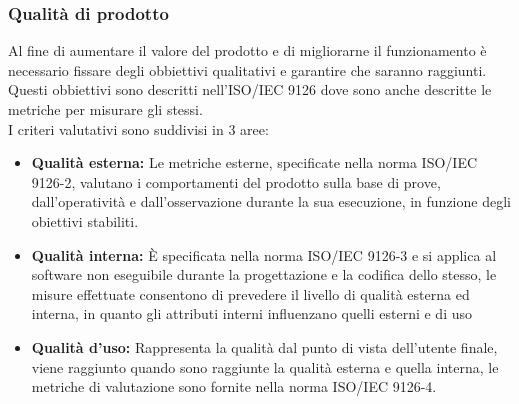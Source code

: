 \documentclass[a4paper]{article}
\begin{document}
			\subsubsection{Qualità di prodotto}
				Al fine di aumentare il valore del prodotto e di migliorarne il funzionamento è necessario fissare degli obbiettivi
				qualitativi e garantire che saranno raggiunti.\\
				Questi obbiettivi sono descritti nell'ISO/IEC 9126 dove sono anche descritte le metriche per misurare gli stessi.\\
				I criteri valutativi sono suddivisi in 3 aree:
				\begin{itemize}
					\item \textbf{Qualità esterna:} Le metriche esterne, specificate nella norma ISO/IEC 9126-2, valutano i
					comportamenti del prodotto sulla base di prove, dall'operatività e dall'osservazione durante la sua esecuzione,
					in funzione degli obiettivi stabiliti.
					\item \textbf{Qualità interna:} È specificata nella norma ISO/IEC 9126-3 e si applica al software non
					eseguibile durante la progettazione e la codifica dello stesso, le misure effettuate consentono di prevedere il
					livello di qualità esterna ed interna, in quanto gli attributi interni influenzano quelli esterni e di uso
					\item \textbf{Qualità d'uso:}  Rappresenta la qualità dal punto di vista dell'utente finale, viene raggiunto
					quando sono raggiunte la qualità esterna e quella interna, le metriche di valutazione sono fornite nella norma
					ISO/IEC 9126-4.
				\end{itemize}
				
\end{document}
